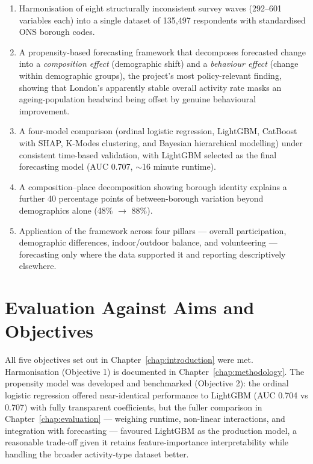 \documentclass[ %
                    author={Ashrey Ashrey, Sanya Kapoor, Trisha Sharma, Yash Bhooshan Pandloskar},
                supervisor={Dr. Dalila O’Grady},
                    degree={MSc},
                     title={Using machine learning to forecast physical activity participation, volunteering and activity patterns in London},
                  subtitle={},
                      type={},
                      year={2021}]{dissertation}
\begin{document}
\begin{enumerate}
    \item Harmonisation of eight structurally inconsistent survey waves (292--601 variables each) into a single dataset of 135,497 respondents with standardised ONS borough codes.
    \item A propensity-based forecasting framework that decomposes forecasted change into a \emph{composition effect} (demographic shift) and a \emph{behaviour effect} (change within demographic groups), the project's most policy-relevant finding, showing that London's apparently stable overall activity rate masks an ageing-population headwind being offset by genuine behavioural improvement.
    \item A four-model comparison (ordinal logistic regression, LightGBM, CatBoost with SHAP, K-Modes clustering, and Bayesian hierarchical modelling) under consistent time-based validation, with LightGBM selected as the final forecasting model (AUC 0.707, $\sim$16 minute runtime).
    \item A composition--place decomposition showing borough identity explains a further 40 percentage points of between-borough variation beyond demographics alone (48\% $\rightarrow$ 88\%).
    \item Application of the framework across four pillars --- overall participation, demographic differences, indoor/outdoor balance, and volunteering --- forecasting only where the data supported it and reporting descriptively elsewhere.
\end{enumerate}

\section{Evaluation Against Aims and Objectives}

All five objectives set out in Chapter~\ref{chap:introduction} were met. Harmonisation (Objective 1) is documented in Chapter~\ref{chap:methodology}. The propensity model was developed and benchmarked (Objective 2): the ordinal logistic regression offered near-identical performance to LightGBM (AUC 0.704 vs 0.707) with fully transparent coefficients, but the fuller comparison in Chapter~\ref{chap:evaluation} --- weighing runtime, non-linear interactions, and integration with forecasting --- favoured LightGBM as the production model, a reasonable trade-off given it retains feature-importance interpretability while handling the broader activity-type dataset better.
\end{document}
